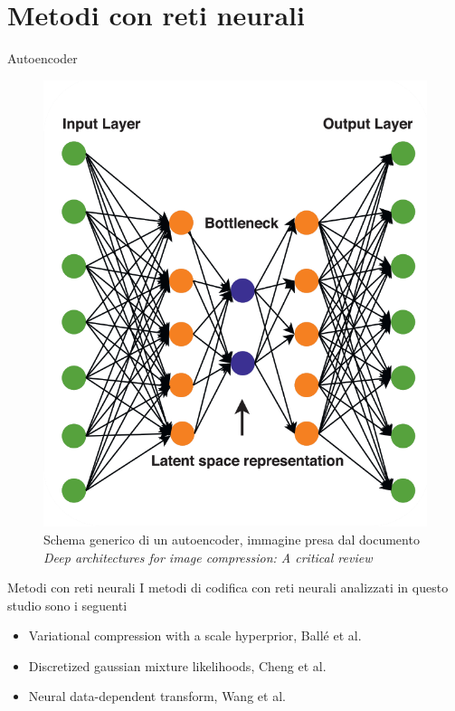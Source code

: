 \section{Metodi con reti neurali}

    \begin{frame}{Autoencoder}
        \begin{figure}[t!]
            \centering
            \includegraphics[width=0.5\textheight]{Immagini/Autoencoder_scheme.png}
            \caption{Schema generico di un autoencoder, immagine presa dal documento \textit{Deep architectures for image compression: A critical review}\footnotemark[1]}
            \label{fig:schemeAutoencoder}
        \end{figure}
    \end{frame}

    \begin{frame}{Metodi con reti neurali}
        I metodi di codifica con reti neurali analizzati in questo studio sono i seguenti
        \begin{itemize}
            \item Variational compression with a scale hyperprior, Ballé et al\footnotemark[1].
            \item Discretized gaussian mixture likelihoods, Cheng et al\footnotemark[2].
            \item Neural data-dependent transform, Wang et al\footnotemark[3]. 
        \end{itemize}
    \end{frame}

